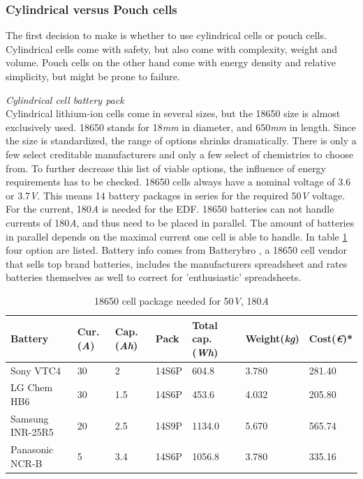 \subsubsection{Cylindrical versus Pouch cells}
The first decision to make is whether to use cylindrical cells or pouch cells. Cylindrical cells come with safety, but also come with complexity, weight and volume. Pouch cells on the other hand come with energy density and relative simplicity, but might be prone to failure.

\textit{Cylindrical cell battery pack}\\
Cylindrical lithium-ion cells come in several sizes, but the 18650 size is almost exclusively used. 18650 stands for 18\textit{mm} in diameter, and 650\textit{mm} in length. Since the size is standardized, the range of options shrinks dramatically. There is only a few select creditable manufacturers and only a few select of chemistries to choose from. To further decrease this list of viable options, the influence of energy requirements has to be checked. 18650 cells always have a nominal voltage of 3.6 or 3.7\textit{V}. This means 14 battery packages in series for the required 50\textit{V} voltage. For the current, 180\textit{A} is needed for the EDF. 18650 batteries can not handle currents of 180\textit{A}, and thus need to be placed in parallel. The amount of batteries in parallel depends on the maximal current one cell is able to handle. In table \ref{Table:18650_cell_comparison} four option are listed. Battery info comes from Batterybro \cite{Batterybro}, a 18650 cell vendor that sells top brand batteries, includes the manufacturers spreadsheet and rates batteries themselves as well to correct for 'enthusiastic' spreadsheets.
\begin{table}[H]
\centering
\caption{18650 cell package needed for 50\textit{V}, 180\textit{A}}
\label{Table:18650_cell_comparison}
\begin{tabular}{|l|l|l|l|l|l|l|}
\hline
Battery & Cur.(\textit{A}) & Cap.(\textit{Ah}) & Pack & Total cap.(\textit{Wh}) & Weight(\textit{kg}) & Cost(\textit{\euro})* \\
\hline\hline
Sony VTC4			& 30			& 2							& 14S6P  & 604.8 & 3.780 & 281.40\\ \hline
LG Chem HB6			& 30				& 1.5				    & 14S6P & 453.6 & 4.032 & 205.80	 \\ \hline
Samsung INR-25R5			& 20			& 2.5			    & 14S9P & 1134.0 & 5.670 &565.74\\ \hline\hline
Panasonic NCR-B			& 5			& 3.4			    & 14S6P & 1056.8 & 3.780 & 335.16\\ \hline
\end{tabular}
\end{table} 
